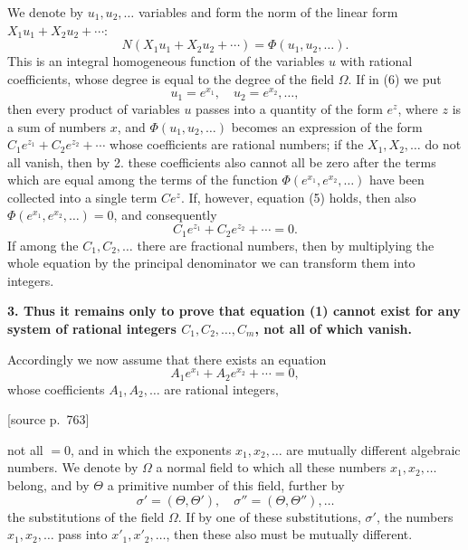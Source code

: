 \documentclass[11pt]{article}
\newcommand{\srcpage}[1]{\par\medskip\noindent\textsf{[source p.~#1]}\par\smallskip}
\begin{document}
We denote by $u_1,u_2,\ldots$ variables and form the norm of the linear form $X_1u_1+X_2u_2+\cdots$:
\begin{equation}\tag{6}
N(X_1u_1+X_2u_2+\cdots)=\Phi(u_1,u_2,\ldots).
\end{equation}
This is an integral homogeneous function of the variables $u$ with rational coefficients, whose degree is equal to the degree of the field $\Omega$. If in (6) we put
\[
u_1=e^{x_1},\quad u_2=e^{x_2},\ldots,
\]
then every product of variables $u$ passes into a quantity of the form $e^z$, where $z$ is a sum of numbers $x$, and $\Phi(u_1,u_2,\ldots)$ becomes an expression of the form $C_1e^{z_1}+C_2e^{z_2}+\cdots$ whose coefficients are rational numbers; if the $X_1,X_2,\ldots$ do not all vanish, then by 2. these coefficients also cannot all be zero after the terms which are equal among the terms of the function $\Phi(e^{x_1},e^{x_2},\ldots)$ have been collected into a single term $Ce^z$. If, however, equation (5) holds, then also $\Phi(e^{x_1},e^{x_2},\ldots)=0$, and consequently
\[
C_1e^{z_1}+C_2e^{z_2}+\cdots=0.
\]
If among the $C_1,C_2,\ldots$ there are fractional numbers, then by multiplying the whole equation by the principal denominator we can transform them into integers.

\textbf{3. Thus it remains only to prove that equation (1) cannot exist for any system of rational integers $C_1,C_2,\ldots,C_m$, not all of which vanish.}

Accordingly we now assume that there exists an equation
\begin{equation}\tag{7}
A_1e^{x_1}+A_2e^{x_2}+\cdots=0,
\end{equation}
whose coefficients $A_1,A_2,\ldots$ are rational integers,
\srcpage{763}
not all $=0$, and in which the exponents $x_1,x_2,\ldots$ are mutually different algebraic numbers. We denote by $\Omega$ a normal field to which all these numbers $x_1,x_2,\ldots$ belong, and by $\Theta$ a primitive number of this field, further by
\[
\sigma'=(\Theta,\Theta'),\quad \sigma''=(\Theta,\Theta''),\ldots
\]
the substitutions of the field $\Omega$. If by one of these substitutions, $\sigma'$, the numbers $x_1,x_2,\ldots$ pass into $x'_1,x'_2,\ldots$, then these also must be mutually different.
\end{document}
